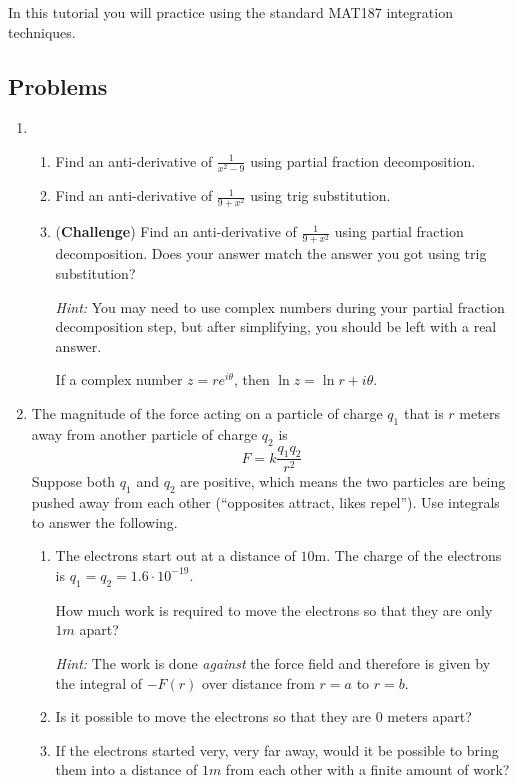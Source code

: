 \begin{objectives}
	In this tutorial you will practice using the standard MAT187 integration techniques.
\end{objectives}

\vspace{-.5em}
\subsection*{Problems}
\vspace{-.5em}


\begin{enumerate}
	\item 
	
\begin{enumerate}
    \item Find an anti-derivative of  $\frac{1}{x^2 - 9}$ using partial fraction decomposition.
    \item Find an anti-derivative of  $\frac{1}{9 + x^2}$ using trig substitution.
    \item (\textbf{Challenge}) Find an anti-derivative of  $\frac{1}{9 + x^2}$ using partial fraction decomposition. Does your answer match the answer you got using trig substitution?

    \emph{Hint:} You may need to use complex numbers during your partial fraction decomposition step, but after simplifying, you should be left with a real answer.

    If a complex number $z=re^{i\theta}$, then $\ln z = \ln r + i\theta$.
\end{enumerate}

\item The magnitude of the force acting on a particle of charge $q_1$ that is $r$ meters away from another particle of charge $q_2$ is
   	\[
	  	F =k\frac{q_1 q_2}{r^2}
   	\]
   	Suppose both $q_1$ and $q_2$ are positive, which means the two particles are being pushed away from each other (``opposites attract, likes repel''). Use integrals to answer the following.
    \begin{enumerate}
        \item The electrons start out at a distance of $10$m.
        The charge of the electrons is $q_1=q_2=1.6\cdot 10^{-19}$.

        How much work is required to move the electrons so that they
        are only $1m$ apart?
        
        \emph{Hint:} The work is done \textit{against} the force field and therefore is given by the integral of $-F(r)$ over distance from $r=a$ to $r=b$.%
        \item Is it possible to move the electrons so that they are $0$ meters apart?
        \item If the electrons started very, very far away, would it be possible to bring them into a distance of $1m$ from each other with a 
        finite amount of work?
    \end{enumerate}


\end{enumerate}
